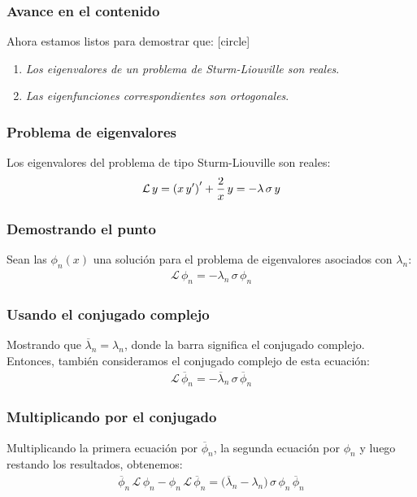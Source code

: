\documentclass[12pt]{beamer}
\begin{document}
\begin{frame}
\frametitle{Avance en el contenido}
Ahora estamos listos para demostrar que:
[circle]
\begin{enumerate}[<+->]
\item  \emph{Los eigenvalores de un problema de Sturm-Liouville son reales}.
\item \emph{Las eigenfunciones correspondientes son ortogonales}.
\end{enumerate}
\end{frame}
\begin{frame}
\frametitle{Problema de eigenvalores}
Los eigenvalores del problema de tipo Sturm-Liouville son reales:
\pause
\begin{align*}
\mathcal{L} \, y = \left( x \, {y}^{\prime} \right)^{\prime} + \dfrac{2}{x} \, y = - \lambda \, \sigma \, y
\end{align*}
\end{frame}
\begin{frame}
\frametitle{Demostrando el punto}
Sean las $\phi_{n}(x)$ una solución para el problema de eigenvalores asociados con $\lambda_{n}$:
\pause
\begin{align*}
\mathcal{L} \, \phi_{n} = - \lambda_{n} \, \sigma \, \phi_{n}
\end{align*}
\end{frame}
\begin{frame}
\frametitle{Usando el conjugado complejo}
Mostrando que $\overline{\lambda}_{n} = \lambda_{n}$, donde la barra significa el conjugado complejo.
\\
\bigskip
\pause
Entonces, también consideramos el conjugado complejo de esta ecuación:
\begin{align*}
\mathcal{L} \, \overline{\phi}_{n} = - \overline{\lambda}_{n} \, \sigma \, \overline{\phi}_{n}
\end{align*}
\end{frame}
\begin{frame}
\frametitle{Multiplicando por el conjugado}
Multiplicando la primera ecuación por $\overline{\phi}_{n}$, la segunda ecuación por $\phi_{n}$ y luego restando los resultados, obtenemos:
\pause
\begin{align*}
\overline{\phi}_{n} \, \mathcal{L} \, \phi_{n} - \phi_{n} \, \mathcal{L} \, \overline{\phi}_{n} = \big( \overline{\lambda}_{n} - \lambda_{n} \big) \, \sigma \, \phi_{n} \, \overline{\phi}_{n}
\end{align*}
\end{frame}
\end{document}
